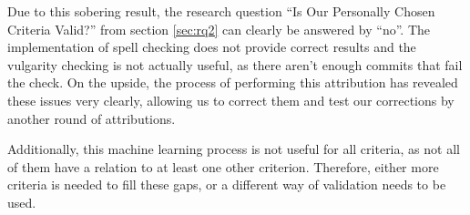 Due to this sobering result, the research question ``Is Our Personally Chosen Criteria Valid?'' from section \ref{sec:rq2} can clearly be answered by ``no''. The implementation of spell checking does not provide correct results and the vulgarity checking is not actually useful, as there aren't enough commits that fail the check. On the upside, the process of performing this attribution has revealed these issues very clearly, allowing us to correct them and test our corrections by another round of attributions.

Additionally, this machine learning process is not useful for all criteria, as not all of them have a relation to at least one other criterion. Therefore, either more criteria is needed to fill these gaps, or a different way of validation needs to be used.


%
%
